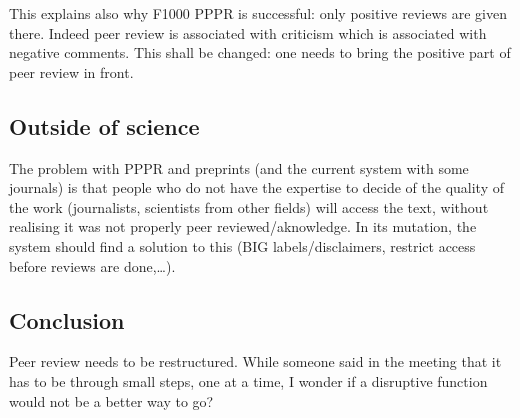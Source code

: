 \documentclass[]{article}
\begin{document}
This explains also why F1000 PPPR is successful: only positive reviews
are given there. Indeed peer review is associated with criticism which
is associated with negative comments. This shall be changed: one needs
to bring the positive part of peer review in front.

\subsection{Outside of science}\label{outside-of-science}

The problem with PPPR and preprints (and the current system with some
journals) is that people who do not have the expertise to decide of the
quality of the work (journalists, scientists from other fields) will
access the text, without realising it was not properly peer
reviewed/aknowledge. In its mutation, the system should find a solution
to this (BIG labels/disclaimers, restrict access before reviews are
done,\ldots{}).

\subsection{Conclusion}\label{conclusion}

Peer review needs to be restructured. While someone said in the meeting
that it has to be through small steps, one at a time, I wonder if a
disruptive function would not be a better way to go?
\end{document}
